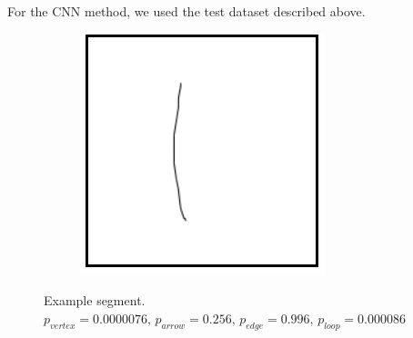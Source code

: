 For the CNN method, we used the test dataset described above.

\begin{figure}
	\centering
	\begin{subfigure}{0.9\textwidth}
		\centering
		\includegraphics[scale=0.5]{./img/classificationexample}
	\end{subfigure}
	\caption{Example segment. $p_{vertex} = 0.0000076\text{, }   p_{arrow} = 0.256\text{, } p_{edge} = 0.996\text{, }  p_{loop} = 0.000086$}
	\label{fig:classification_example}
\end{figure}

%
%

